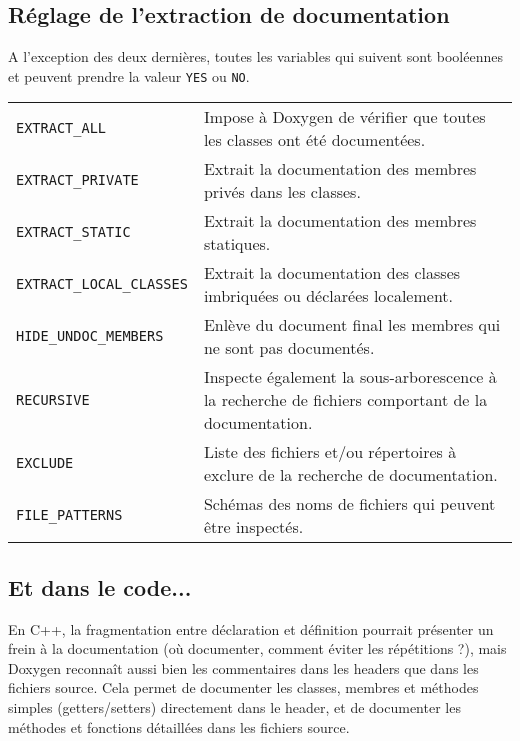  \newpage
  \subsection{Réglage de l'extraction de documentation}
    A l'exception des deux dernières, toutes les variables qui suivent sont booléennes et peuvent prendre la valeur \texttt{YES} ou \texttt{NO}.\\

    \noindent
    \begin{tabular}{p{.3\linewidth}p{.65\linewidth}}
      \texttt{EXTRACT\_ALL} & Impose à Doxygen de vérifier que toutes les classes ont été documentées.\\
      \texttt{EXTRACT\_PRIVATE} & Extrait la documentation des membres privés dans les classes.\\
      \texttt{EXTRACT\_STATIC} & Extrait la documentation des membres statiques.\\
      \texttt{EXTRACT\_LOCAL\_CLASSES} & Extrait la documentation des classes imbriquées ou déclarées localement.\\
      \texttt{HIDE\_UNDOC\_MEMBERS} & Enlève du document final les membres qui ne sont pas documentés.\\
      \texttt{RECURSIVE} & Inspecte également la sous-arborescence à la recherche de fichiers comportant de la documentation.\\
      \texttt{EXCLUDE} & Liste des fichiers et/ou répertoires à exclure de la recherche de documentation.\\
      \texttt{FILE\_PATTERNS} & Schémas des noms de fichiers qui peuvent être inspectés\footnotemark[2].\\
    \end{tabular}

  \subsection{Et dans le code...}
    En C++, la fragmentation entre déclaration et définition pourrait présenter un frein à la documentation (où documenter, comment éviter les répétitions ?), mais Doxygen reconnaît aussi bien les commentaires dans les headers que dans les fichiers source. Cela permet de documenter les classes, membres et méthodes simples (getters/setters) directement dans le header, et de documenter les méthodes et fonctions détaillées dans les fichiers source.


